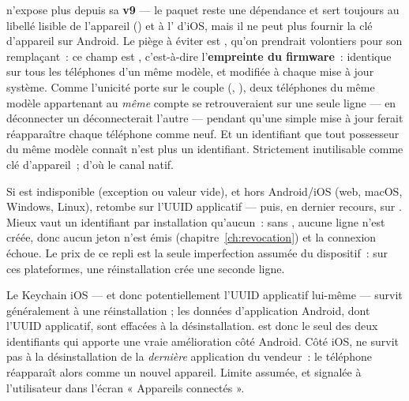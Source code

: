 \begin{alerte}
 n'expose plus  depuis sa \textbf{v9} --- le
paquet reste une dépendance et sert toujours au libellé lisible de l'appareil
() et à l' d'iOS, mais il ne peut
plus fournir la clé d'appareil sur Android. Le piège à éviter est
, qu'on prendrait volontiers pour son remplaçant~: ce champ est
, c'est-à-dire l'\textbf{empreinte du firmware}~: identique sur tous les
téléphones d'un même modèle, et modifiée à chaque mise à jour système. Comme l'unicité
porte sur le couple (, ), deux téléphones du même modèle
appartenant au \emph{même} compte se retrouveraient sur une seule ligne --- en déconnecter
un déconnecterait l'autre --- pendant qu'une simple mise à jour ferait réapparaître chaque
téléphone comme neuf. Et un identifiant que tout possesseur du même modèle connaît n'est
plus un identifiant. Strictement inutilisable comme clé d'appareil~; d'où le canal natif.
\end{alerte}

\begin{note}
Si  est indisponible (exception ou valeur vide), et hors Android/iOS
(web, macOS, Windows, Linux),  retombe sur l'UUID applicatif
 --- puis, en dernier recours, sur
. Mieux vaut un identifiant par installation qu'aucun~: sans
, aucune ligne  n'est créée, donc aucun jeton n'est émis
(chapitre~\ref{ch:revocation}) et la connexion échoue. Le prix de ce repli est la seule
imperfection assumée du dispositif~: sur ces plateformes, une réinstallation crée une
seconde ligne.
\end{note}

\begin{alerte}
Le Keychain iOS --- et donc potentiellement l'UUID applicatif lui-même --- survit
généralement à une réinstallation ; les données d'application Android, dont l'UUID
applicatif, sont effacées à la désinstallation.  est donc le seul des
deux identifiants qui apporte une vraie amélioration côté Android. Côté iOS,
 ne survit pas à la désinstallation de la \emph{dernière}
application du vendeur~: le téléphone réapparaît alors comme un nouvel appareil. Limite
assumée, et signalée à l'utilisateur dans l'écran « Appareils connectés ».
\end{alerte}

